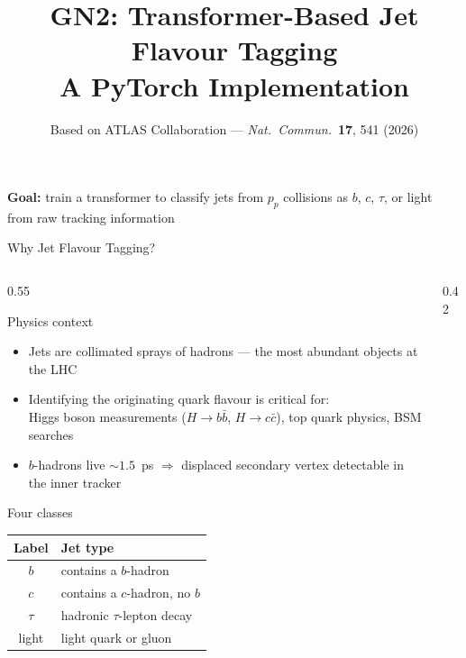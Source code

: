 \documentclass[aspectratio=169, 10pt]{beamer}
\title[GN2 Jet Flavour Tagging]%
      {\textbf{GN2: Transformer-Based Jet Flavour Tagging}\\
       \small A PyTorch Implementation}
\subtitle{Based on ATLAS Collaboration --- \textit{Nat.\ Commun.}\ \textbf{17}, 541 (2026)}
\author{}
\date{}
\begin{document}
\begin{frame}
\titlepage
\vspace{-8pt}
\begin{center}
  \small
  \textbf{Goal:} train a transformer to classify jets from $p_p$ collisions
  as $b$, $c$, $\tau$, or light from raw tracking information
\end{center}
\end{frame}

\begin{frame}{Why Jet Flavour Tagging?}
\begin{columns}[T]
  \begin{column}{0.55\textwidth}
    \begin{block}{Physics context}
      \begin{itemize}
        \item Jets are collimated sprays of hadrons --- the most abundant
              objects at the LHC
        \item Identifying the originating quark flavour is critical for:\\
              Higgs boson measurements ($H\to b\bar{b}$, $H\to c\bar{c}$),
              top quark physics, BSM searches
        \item $b$-hadrons live $\sim 1.5$~ps $\Rightarrow$ displaced secondary
              vertex detectable in the inner tracker
      \end{itemize}
    \end{block}
    \begin{block}{Four classes}
      \centering
      \vspace{2pt}
      \begin{tabular}{cl}
        \toprule
        Label & Jet type \\
        \midrule
        $b$ & contains a $b$-hadron \\
        $c$ & contains a $c$-hadron, no $b$ \\
        $\tau$ & hadronic $\tau$-lepton decay \\
        light & light quark or gluon \\
        \bottomrule
      \end{tabular}
      \vspace{2pt}
    \end{block}
  \end{column}
  \begin{column}{0.42\textwidth}

\end{column}
\end{columns}
\end{frame}
\end{document}

